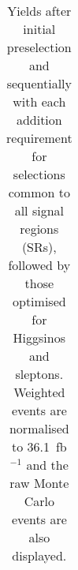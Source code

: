 \begin{table}
\begin{center}
\begin{tabular*}{\textwidth}{@{\extracolsep{\fill}}lrrrrrrrrrrrr}
  \bottomrule
  \end{tabular*}
\end{center}
\caption{ Yields after initial preselection and sequentially with each addition requirement 
for selections common to all signal regions (SRs), 
followed by those optimised for Higgsinos and sleptons. 
Weighted events are normalised to 36.1~fb$^{-1}$ and the raw Monte Carlo events are also displayed.
}
\label{tab:cutflow_NUHM2}
\end{table} 
  